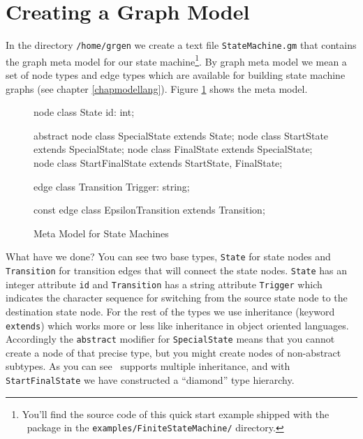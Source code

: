 \section{Creating a Graph Model}
In the directory \texttt{/home/grgen} we create a text file \texttt{StateMachine.gm} that contains the graph meta model for our state machine\footnote{You'll find the source code of this quick start example shipped with the \GrG\ package in the \texttt{examples/FiniteStateMachine/} directory.}.
By graph meta model we mean a set of node types and edge types which are available for building state machine graphs (see chapter \ref{chapmodellang}).
Figure \ref{fig:quick:mm} shows the meta model.
\begin{figure}[htbp]
    \centering
    \begin{grgen}
node class State {
    id: int;
}

abstract node class SpecialState extends State;
node class StartState extends SpecialState;
node class FinalState extends SpecialState;
node class StartFinalState extends StartState, FinalState;

edge class Transition {
    Trigger: string;
}

const edge class EpsilonTransition extends Transition;    
    \end{grgen}
    \caption{Meta Model for State Machines}
    \label{fig:quick:mm}
\end{figure}    
What have we done?
You can see two base types, \texttt{State} for state nodes and \texttt{Transition} for transition edges that will connect the state nodes.
\texttt{State} has an integer attribute \texttt{id} and \texttt{Transition} has a string attribute \texttt{Trigger} which indicates the character sequence for switching from the source state node to the destination state node.
For the rest of the types we use inheritance (keyword \texttt{extends}) which works more or less like inheritance in object oriented languages.
Accordingly the \texttt{abstract} modifier for \texttt{SpecialState} means that you cannot create a node of that precise type, but you might create nodes of non-abstract subtypes.
As you can see \GrG\ supports multiple inheritance, and with \texttt{StartFinalState} we have constructed a ``diamond'' type hierarchy.

